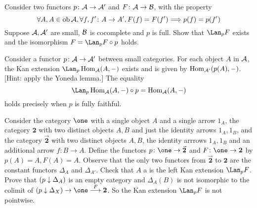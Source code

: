   \begin{ex}
    Consider two functors $p\colon{\cal A}\to{\cal A}'$ and $F\colon{\cal A}\to{\cal B}$, with the property
    \begin{equation*}
      \forall A,A\in\operatorname{ob}{\cal A}, \forall f,f'\colon A\to A',  F(f)=F(f')\Longrightarrow p(f)=p(f')
    \end{equation*}
    Suppose ${\cal A},{\cal A}'$ are small, ${\cal B}$ is cocomplete and $p$ is full. 
    Show that $\Lan_pF$ exists and the isomorphism $F = \Lan_pF \circ p$ holds.
  \end{ex}
  \begin{ex}
    Consider a functor $p\colon{\cal A}\to{\cal A}'$ between small categories. For each object $A$ in ${\cal A}$, the Kan extension $\Lan_p\Hom_{\Aa}(A,-)$ exists and is given by 
    $\operatorname{Hom}_{{\cal A}'}(p(A),-)$. [Hint: apply the Yoneda lemma.] The equality 
    \begin{equation*}
      \Lan_p\Hom_{\Aa}(A,-)\circ p = \Hom_{\Aa}(A,-)
    \end{equation*}
    holds precisely when $p$ is fully faithful.
  \end{ex}
  \begin{ex}
    Consider the category $\one$ with a single object $A$ and a single arrow $1_A$, the category $\mathbf{2}$ with two distinct objects $A, B$ and just the identity arrows $1_A,1_B$, and the category $\vec{\mathbf{2}}$ with two distinct objects $A, B$, the identity arrrows $1_A, 1_B$ and an additional arrow $f\colon B \to A$. 
    Define the functors $p\colon \one \to \vec{\mathbf{2}}$ and $F\colon \one \to \mathbf{2}$ by $p(A) = A, F(A) = A$. 
    Observe that the only two functors from $\vec{\mathbf{2}}$ to $\mathbf{2}$ are the constant functors $\Delta_A$ and $\Delta_{A'}$. Check that $A$ a is the left Kan extension $\Lan_pF$. Prove that $(p\downarrow\Delta_A)$ is an empty category and $\Delta_A(B)$ is not isomorphic to the colimit of $(p\down\Delta_X)\to\one\markar{F}\mathbf{2}$. So the Kan extension $\Lan_pF$ is not pointwise.
  \end{ex}
